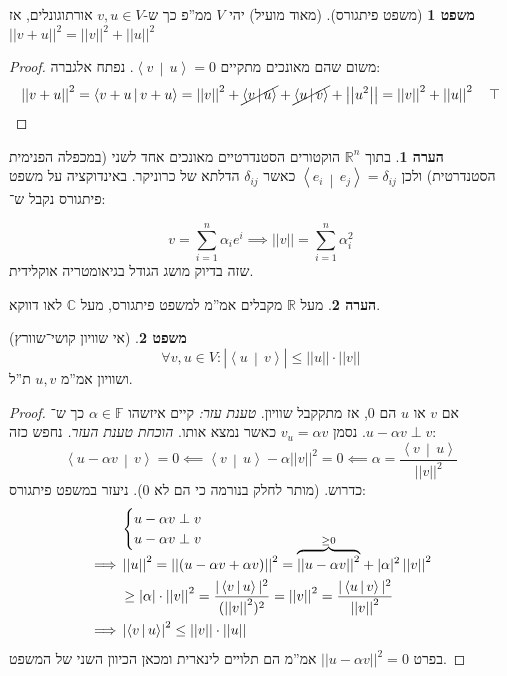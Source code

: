 \documentclass[a4paper]{article}
\newcommand\R     {\mathbb{R}}
\newcommand\C     {\mathbb{C}}
\newcommand\ra    {\rangle}
\newcommand\la    {\langle}
\newcommand\F         {\mathbb{F}}
\newcommand\co        {\colon}
\newcommand\norm[1]   {\left \vert \left \vert #1 \right \vert \right \vert}
\newcommand\mut [2]   {\left \la #1 \,\middle|\, #2 \right \ra}
\newcommand\ag        {\alpha}
\newcommand\sof[1]    {\left | #1 \right |}
\newcommand\dequad    {\!\!\!\!\!\!}
\theoremstyle{definition}
\newtheorem{Theorem}{\color{myblue}משפט}
\newtheorem{Remark}{\color{mycyan}הערה}
\newcommand\theo  [1] {\begin{Theorem}#1\end{Theorem}}
\newcommand\rmark [1] {\begin{Remark}#1\end{Remark}}
\begin{document}
	\begin{Theorem}[משפט פיתגורס]
		(מאוד מועיל) יהי $V$ ממ''פ כך ש-$v, u \in V$ אורתוגונלים, אז $\norm{v + u}^2 = \norm{v}^2 + \norm{u}^2$
	\end{Theorem}\begin{proof} משום שהם מאונכים מתקיים $\mut{v}{u} = 0$. נפתח אלגברה: 
		\[ \norm{v + u}^2 = \mut{v + u}{v + u} = \norm{v}^2 + \cancel{\mut{v}{u}} + \cancel{\mut{u}{v}} + \norm{u^2} = \norm{v}^2 + \norm{u}^2 \quad \top \]
	\end{proof}
	
	\rmark{בתוך $\R^n$ הוקטורים הסטנדרטיים מאונכים אחד לשני (במכפלה הפנימית הסטנדרטית) ולכן $\mut{e_i}{e_j} = \delta_{ij}$ כאשר $\delta_{ij}$ הדלתא של כרוניקר. באינדוקציה על משפט פיתגורס נקבל ש־: }
	
	\[ v = \sum_{i = 1}^{n}\ag_i e^i \implies \norm{v} = \sum_{i = 1}^{n}\ag_i^2 \]
	שזה בדיוק מושג הגודל בגיאומטריה אוקלידית. 
	
	\rmark{מעל $\R$ מקבלים אמ''מ למשפט פיתגורס, מעל $\C$ לאו דווקא. }
	
	\theo{(אי שוויון קושי־שוורץ)
		\[ \forall v, u \in V \co \sof{\mut{u}{v}} \le \norm{u}\cdot\norm{v} \]
		ושוויון אמ''מ $u, v$ ת''ל. }
	
	\begin{proof}
		אם $v$ או $u$ הם $0$, אז מתקקבל שוויון. 
		\textit{טענת עזר: }קיים איזשהו $\ag \in \F$ כך ש־$u - \ag v \perp v$. נסמן $v_u = \ag v$ כאשר נמצא אותו. 
		\textit{הוכחת טענת העזר. }נחפש כזה: 
		\[ \mut{u - \ag v}{v} = 0 \impliedby \mut{v}{u} - \ag \norm{v}^2 = 0 \impliedby \ag = \frac{\mut{v}{u}}{\norm{v}^2} \]
		כדרוש. (מותר לחלק בנורמה כי הם לא $0$). ניעזר במשפט פיתגורס: 
		\begin{align*}
			&\begin{cases}
				u - \ag v \perp v \\ u - \ag v \perp v
			\end{cases}\dequad  \\
			\implies &\norm{u}^2 = \norm{(u - \ag v + \ag v)}^2 = \smash{\overbrace{\norm{u - \ag v}^2}^{\ge 0}} + |\ag|^2\norm{v}^2 \\ 
				&\ge |\ag|\cdot\norm{v}^2 = \frac{|\mut{v}{u}|^2}{(\norm{v}^2)^2} = \norm{v}^2 = \frac{|\mut{u}{v}|^2}{\norm{v}^2} \\
			\implies &\sof{\mut{v}{u}}^2 \le \norm{v} \cdot \norm{u}
		\end{align*}
		בפרט $\norm{u - \ag v}^2 = 0$ אמ''מ הם תלויים לינארית ומכאן הכיוון השני של המשפט. 
	\end{proof}
	
\end{document}
